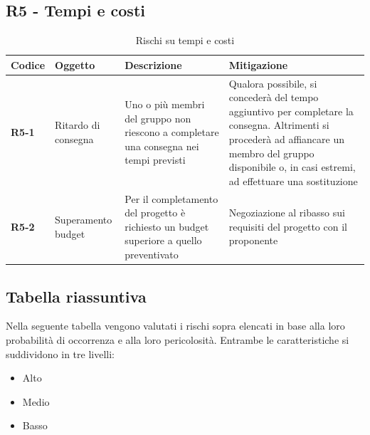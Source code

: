 \documentclass[a4paper,12pt]{article}
\begin{document}
    \subsection{R5 - Tempi e costi}
        \begin{table}[H]
        \caption{Rischi su tempi e costi}
        \label{tab:r5}
            \begin{tabularx}{\textwidth}{|l|L|L|L|}
            \hline
            \textbf{Codice} & \textbf{Oggetto} & \textbf{Descrizione} & \textbf{Mitigazione}\\
            \hline
            \textbf{R5-1} & Ritardo di consegna & Uno o più membri del gruppo non riescono a completare una consegna nei tempi previsti & Qualora possibile, si concederà del tempo aggiuntivo per completare la consegna. Altrimenti si procederà ad affiancare un membro del gruppo disponibile o, in casi estremi, ad effettuare una sostituzione\\
            \hline
            \textbf{R5-2} & Superamento budget & Per il completamento del progetto è richiesto un budget superiore a quello preventivato & Negoziazione al ribasso sui requisiti del progetto con il proponente \\
            \hline
            \end{tabularx}
        \end{table}

    \subsection{Tabella riassuntiva}
        Nella seguente tabella vengono valutati i rischi sopra elencati in base alla loro probabilità di occorrenza e alla loro pericolosità. Entrambe le caratteristiche si suddividono in tre livelli:
        \begin{itemize}
            \item Alto
            \item Medio
            \item Basso
        \end{itemize}
\end{document}
